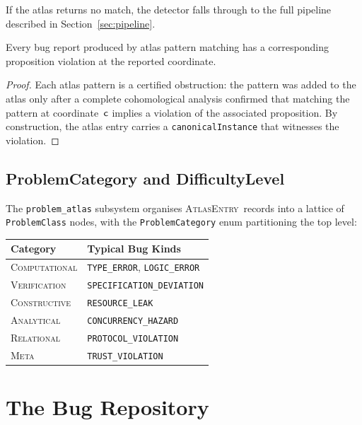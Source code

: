 \documentclass[11pt]{article}
\newcommand{\AtlasEnt}{\textsc{AtlasEntry}}       %
\begin{document}
If the atlas returns no match, the detector falls through to the full
pipeline described in Section~\ref{sec:pipeline}.

\begin{proposition}\label{prop:atlas-sound}
Every bug report produced by atlas pattern matching has a corresponding
proposition violation at the reported coordinate.
\end{proposition}

\begin{proof}
Each atlas pattern is a certified obstruction: the pattern was added to
the atlas only after a complete cohomological analysis confirmed that
matching the pattern at coordinate~$\mathsf{c}$ implies a violation of the
associated proposition.  By construction, the atlas entry carries a
\texttt{canonicalInstance} that witnesses the violation.
\end{proof}

\subsection{ProblemCategory and DifficultyLevel}

The \texttt{problem\_atlas} subsystem organises \AtlasEnt\ records into
a lattice of \texttt{ProblemClass} nodes, with the \texttt{ProblemCategory}
enum partitioning the top level:

\begin{center}
\begin{tabular}{ll}
\toprule
\textbf{Category} & \textbf{Typical Bug Kinds} \\
\midrule
\textsc{Computational}  & \texttt{TYPE\_ERROR}, \texttt{LOGIC\_ERROR} \\
\textsc{Verification}   & \texttt{SPECIFICATION\_DEVIATION} \\
\textsc{Constructive}   & \texttt{RESOURCE\_LEAK} \\
\textsc{Analytical}     & \texttt{CONCURRENCY\_HAZARD} \\
\textsc{Relational}     & \texttt{PROTOCOL\_VIOLATION} \\
\textsc{Meta}           & \texttt{TRUST\_VIOLATION} \\
\bottomrule
\end{tabular}
\end{center}

\section{The Bug Repository}\label{sec:repository}
\end{document}
